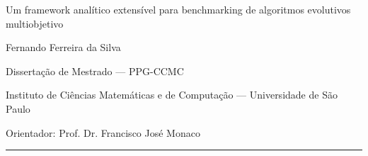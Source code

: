 
\begin{frame}[plain]
\vspace{.85cm}
{\Large\color{navy}Um framework analítico extensível para benchmarking de algoritmos evolutivos multiobjetivo\par}
\vspace{.65cm}
{\large Fernando Ferreira da Silva\par}
\vspace{.2cm}Dissertação de Mestrado --- PPG-CCMC\par
\vspace{.42cm}Instituto de Ciências Matemáticas e de Computação --- Universidade de São Paulo\par
Orientador: Prof. Dr. Francisco José Monaco
\end{frame}

\begin{frame}[plain]
\vspace{.3cm}\textcolor{navy!40}{\rule{.76\linewidth}{.65pt}}
\end{frame}

